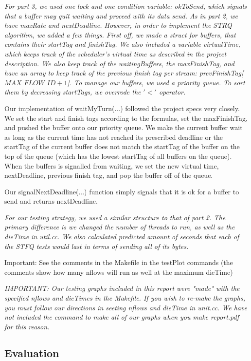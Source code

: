 \documentclass[11pt, letterpaper]{article}
\begin{document}
{\em For part 3, we used one lock and one condition variable: okToSend, which signals 
that a buffer may quit waiting and proceed with its data send. As in part 2, we 
have maxRate and nextDeadline. 
However, in order to implement the STRQ algorithm, we added a few things. 
First off, we made a struct for buffers, that contains their startTag and finishTag. 
We also included a variable virtualTime, which keeps track of the scheduler's virtual 
time as described in the project description. We also keep track of the waitingBuffers, 
the maxFinishTag, and have an array to keep track of the previous finish tag per stream: 
prevFinishTag[$MAX\_FLOW\_ID + 1$]. To manage our buffers, we used a priority queue. To sort 
them by decreasing startTags, we overrode the $'<'$ operator.

Our implementation of waitMyTurn(...) followed the project specs very closely. We set the 
start and finish tags according to the formulas, set the maxFinishTag, and pushed the 
buffer onto our priority queue. We make the current buffer wait as long as the current 
time has not reached its prescribed deadline or the startTag of the current buffer does not 
match the startTag of the buffer on the top of the queue (which has the lowest startTag 
of all buffers on the queue). When the buffers is signalled from waiting, we set the new 
virtual time, nextDeadline, previous finish tag, and pop the buffer off of the queue. 

Our signalNextDeadline(...) function simply signals that it is ok for a buffer to send and 
returns nextDeadline.}

{\em For our testing strategy, we used a similar structure to that
of part 2. The primary difference is we changed
the number of threads to run, as well as the dieTime in util.cc. 
We also calculated predicted amount of seconds that each of the STFQ 
tests would last in terms of sending all of its bytes. 

Important: See the comments in the Makefile in the testPlot commands
(the comments show how many nflows will run as well at the maximum dieTime)}

{\em IMPORTANT: Our testing graphs included in this report were "made" with the specified 
nflows and dieTimes in the Makefile. If you wish to re-make the graphs, you must follow 
our directions in seeting nflows and dieTime in unit.cc. We have not included the command 
to make all of our graphs when you make report.pdf for this reason.}

\subsection{Evaluation}
\end{document}
